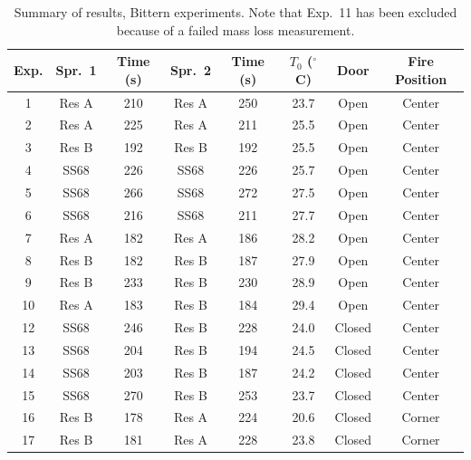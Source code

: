 \begin{table}[!ht]
\centering
\caption[Summary of results, Bittern experiments]{Summary of results, Bittern experiments. Note that Exp.~11 has been excluded because of a failed mass loss measurement.}
\label{bit_sum}
\begin{tabular}{|c|c|c|c|c|c|c|c|}
\hline
Exp. & Spr.~1 & Time (s) & Spr.~2 & Time (s) & $T_0$ ($^\circ$C) & Door   & Fire Position \\ \hline \hline
1    & Res A  & 210      & Res A  & 250      & 23.7              & Open   & Center        \\ \hline
2    & Res A  & 225      & Res A  & 211      & 25.5              & Open   & Center        \\ \hline
3    & Res B  & 192      & Res B  & 192      & 25.5              & Open   & Center        \\ \hline
4    & SS68   & 226      & SS68   & 226      & 25.7              & Open   & Center        \\ \hline
5    & SS68   & 266      & SS68   & 272      & 27.5              & Open   & Center        \\ \hline
6    & SS68   & 216      & SS68   & 211      & 27.7              & Open   & Center        \\ \hline
7    & Res A  & 182      & Res A  & 186      & 28.2              & Open   & Center        \\ \hline
8    & Res B  & 182      & Res B  & 187      & 27.9              & Open   & Center        \\ \hline
9    & Res B  & 233      & Res B  & 230      & 28.9              & Open   & Center        \\ \hline
10   & Res A  & 183      & Res B  & 184      & 29.4              & Open   & Center        \\ \hline
12   & SS68   & 246      & Res B  & 228      & 24.0              & Closed & Center        \\ \hline
13   & SS68   & 204      & Res B  & 194      & 24.5              & Closed & Center        \\ \hline
14   & SS68   & 203      & Res B  & 187      & 24.2              & Closed & Center        \\ \hline
15   & SS68   & 270      & Res B  & 253      & 23.7              & Closed & Center        \\ \hline
16   & Res B  & 178      & Res A  & 224      & 20.6              & Closed & Corner        \\ \hline
17   & Res B  & 181      & Res A  & 228      & 23.8              & Closed & Corner        \\ \hline

\end{tabular}
\end{table}

